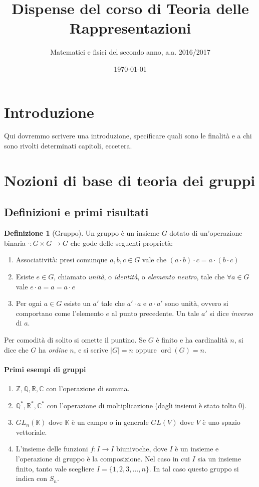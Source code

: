 \documentclass[11pt]{article}
\title{Dispense del corso di Teoria delle Rappresentazioni}
\author{Matematici e fisici del secondo anno, a.a. 2016/2017}
\date{\today}
\theoremstyle{plain}
\theoremstyle{definition}
\newtheorem{defn}{Definizione}[section]
\theoremstyle{remark}
\newcommand{\K}{\mathbb{K}}
\DeclareMathOperator{\ord}{ord}
\begin{document}
\maketitle
\tableofcontents

\newpage
\section*{Introduzione}
Qui dovremmo scrivere una introduzione, specificare quali sono le finalità e a chi sono rivolti determinati capitoli, eccetera.

\newpage
\section{Nozioni di base di teoria dei gruppi}

\subsection{Definizioni e primi risultati}

\begin{defn}[Gruppo] Un gruppo è un insieme $G$ dotato di un'operazione binaria $\cdot : G\times G \to G$ che gode delle seguenti proprietà:
\begin{enumerate}
	\item Associatività: presi comunque $a,b,c\in G$ vale che $(a\cdot b)\cdot c = a\cdot(b\cdot c)$
	\item Esiste $e\in G$, chiamato \emph{unità}, o \emph{identità}, o \emph{elemento neutro}, tale che $\forall a\in G$ vale $e\cdot a = a = a\cdot e$
	\item Per ogni $a\in G$ esiste un $a'$ tale che $a'\cdot a$ e $a\cdot a'$ sono unità, ovvero si comportano come l'elemento $e$ al punto precedente.
		  Un tale $a'$ si dice \emph{inverso} di $a$.
\end{enumerate}
Per comodità di solito si omette il puntino. Se $G$ è finito e ha cardinalità $n$, si dice che $G$ ha \emph{ordine} $n$,
e si scrive $|G|=n$ oppure $\ord(G)=n$.
\end{defn}

\paragraph{Primi esempi di gruppi}
\begin{enumerate}
	\item $\mathbb{Z}, \mathbb{Q}, \mathbb{R}, \mathbb{C}$ con l'operazione di somma.
	\item $\mathbb{Q}^*, \mathbb{R}^*, \mathbb{C}^*$ con l'operazione di moltiplicazione (dagli insiemi è stato tolto $0$).
	\item $GL_n(\mathbb{\K})$ dove $\K$ è un campo o in generale $GL(V)$ dove $V$ è uno spazio vettoriale.
	\item L'insieme delle funzioni $f:I\to I $ biunivoche, dove $I$ è un insieme e l'operazione di gruppo è la composizione. Nel caso in cui $I$ sia un insieme finito, tanto vale scegliere $I = \{1,2,3,\ldots, n\}$. In tal caso questo gruppo si indica con $S_n$.
\end{enumerate}
\end{document}
